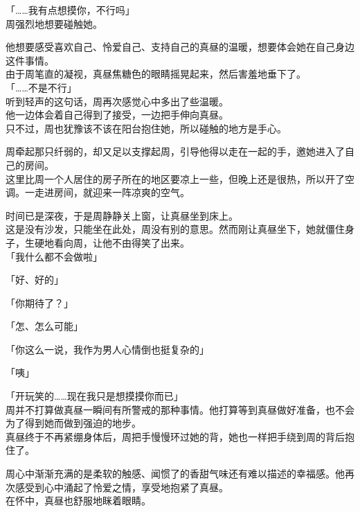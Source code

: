「……我有点想摸你，不行吗」\\

周强烈地想要碰触她。

他想要感受喜欢自己、怜爱自己、支持自己的真昼的温暖，想要体会她在自己身边这件事情。\\

由于周笔直的凝视，真昼焦糖色的眼睛摇晃起来，然后害羞地垂下了。\\

「……不是不行」\\

听到轻声的这句话，周再次感觉心中多出了些温暖。\\

他一边体会着自己得到了接受，一边把手伸向真昼。\\

只不过，周也犹豫该不该在阳台抱住她，所以碰触的地方是手心。

周牵起那只纤弱的，却又足以支撑起周，引导他得以走在一起的手，邀她进入了自己的房间。\\

这里比周一个人居住的房子所在的地区要凉上一些，但晚上还是很热，所以开了空调。一走进房间，就迎来一阵凉爽的空气。

时间已是深夜，于是周静静关上窗，让真昼坐到床上。\\

这是没有沙发，只能坐在此处，周没有别的意思。然而刚让真昼坐下，她就僵住身子，生硬地看向周，让他不由得笑了出来。\\

「我什么都不会做啦」

「好、好的」

「你期待了？」

「怎、怎么可能」

「你这么一说，我作为男人心情倒也挺复杂的」

「咦」

「开玩笑的……现在我只是想摸摸你而已」\\

周并不打算做真昼一瞬间有所警戒的那种事情。他打算等到真昼做好准备，也不会为了得到她而做到强迫的地步。\\

真昼终于不再紧绷身体后，周把手慢慢环过她的背，她也一样把手绕到周的背后抱住了。

周心中渐渐充满的是柔软的触感、闻惯了的香甜气味还有难以描述的幸福感。他再次感受到心中涌起了怜爱之情，享受地抱紧了真昼。\\

在怀中，真昼也舒服地眯着眼睛。

